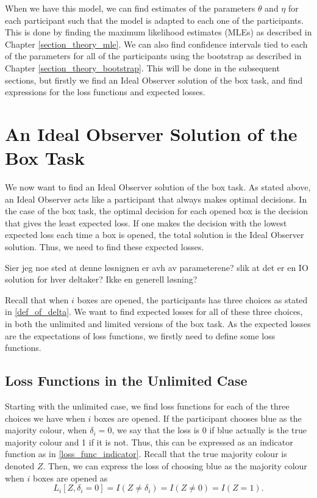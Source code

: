 When we have this model, we can find estimates of the parameters $\theta$ and $\eta$ for each participant such that the model is adapted to each one of the participants. This is done by finding the maximum likelihood estimates (MLEs) as described in Chapter \ref{section_theory_mle}. 
We can also find confidence intervals tied to each of the parameters for all of the participants using the bootstrap as described in Chapter \ref{section_theory_bootstrap}. This will be done in the subsequent sections, but firstly we find an Ideal Observer solution of the box task, and find expressions for the loss functions and expected losses. 


\section{An Ideal Observer Solution of the Box Task}
We now want to find an Ideal Observer solution of the box task. As stated above, an Ideal Observer acts like a participant that always makes optimal decisions. In the case of the box task, the optimal decision for each opened box is the decision that gives the least expected loss. If one makes the decision with the lowest expected loss each time a box is opened, the total solution is the Ideal Observer solution. Thus, we need to find these expected losses. 

Sier jeg noe sted at denne løsnignen er avh av parameterene? slik at det er en IO solution for hver deltaker? Ikke en generell løsning?

Recall that when $i$ boxes are opened, the participants has three choices as stated in \eqref{def_of_delta}. We want to find expected losses for all of these three choices, in both the unlimited and limited versions of the box task. As the expected losses are the expectations of loss functions, we firstly need to define some loss functions. 



\subsection{Loss Functions in the Unlimited Case}
Starting with the unlimited case, we find loss functions for each of the three choices we have when $i$ boxes are opened. If the participant chooses blue as the majority colour, when $\delta_i=0$, we say that the loss is 0 if blue actually is the true majority colour and 1 if it is not. Thus, this can be expressed as an indicator function as in \eqref{loss_func_indicator}. Recall that the true majority colour is denoted $Z$. Then, we can express the loss of choosing blue as the majority colour when $i$ boxes are opened as
\begin{equation}
\label{loss_func_blue}
    L_i[Z,\delta_i=0] = I(Z \neq \delta_i) = I(Z\neq0) = I(Z=1).
\end{equation}

